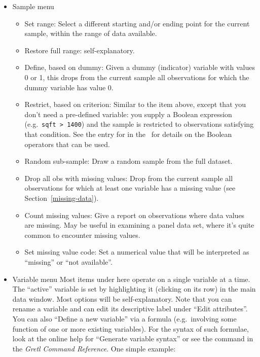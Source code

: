 \begin{itemize}
\item \textsf{Sample menu}
  \begin{itemize}
  \item \textsf{Set range}: Select a different starting and/or ending
    point for the current sample, within the range of data available.
  \item \textsf{Restore full range}: self-explanatory.
  \item \textsf{Define, based on dummy}: Given a dummy (indicator)
    variable with values 0 or 1, this drops from the current sample
    all observations for which the dummy variable has value 0.
  \item \textsf{Restrict, based on criterion}: Similar to the item
    above, except that you don't need a pre-defined variable: you
    supply a Boolean expression (e.g.\ \verb+sqft > 1400+) and the
    sample is restricted to observations satisfying that condition.
    See the entry for  in the \GCR\
    for details on the Boolean operators that can be used.
  \item \textsf{Random sub-sample}: Draw a random sample from the full dataset.
  \item \textsf{Drop all obs with missing values}: Drop from the
    current sample all observations for which at least one variable
    has a missing value (see Section~\ref{missing-data}).
  \item \textsf{Count missing values}: Give a report on observations
    where data values are missing. May be useful in examining a panel
    data set, where it's quite common to encounter missing values.
  \item \textsf{Set missing value code}: Set a numerical value that
    will be interpreted as ``missing'' or ``not available''.
  \end{itemize}

\item \textsf{Variable menu} Most items under here operate on a single
  variable at a time.  The ``active'' variable is set by highlighting
  it (clicking on its row) in the main data window.  Most options will
  be self-explanatory.  Note that you can rename a variable and can
  edit its descriptive label under ``Edit attributes''. You can also
  ``Define a new variable'' via a formula (e.g.\ involving some
  function of one or more existing variables). For the syntax of such
  formulae, look at the online help for ``Generate variable syntax''
  or see the \cmd{genr} command in the \emph{Gretl Command Reference}.
  One simple example:
          

\end{itemize}
